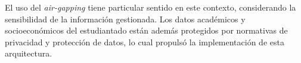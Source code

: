 El uso del \textit{air-gapping} tiene particular sentido en este contexto, considerando la sensibilidad de la información gestionada. Los datos académicos y socioeconómicos del estudiantado están además protegidos por normativas de privacidad y protección de datos, lo cual propulsó la implementación de esta arquitectura.

